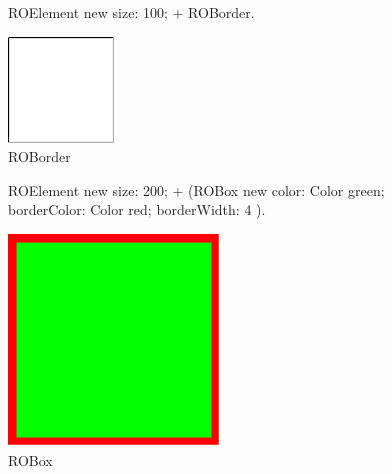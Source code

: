 \documentclass[a4paper,10pt,twoside]{book}
\begin{document}
\begin{figure}[H]
      \begin{minipage}[t]{0.5\textwidth}
      \vspace{0pt}
     \begin{code}
     
	ROElement new 
		size: 100; 
		+ ROBorder.	\end{code}
   \end{minipage}
   \hfill
   \begin{minipage}[t]{0.4\textwidth}
      \vspace{0pt} \raggedright
       \centering
		\includegraphics[width=0.25\textwidth]{border}
   \end{minipage}
\caption{ROBorder}
\label{fig:border}
\end{figure}  

\begin{figure}[H]
      \begin{minipage}[t]{0.5\textwidth}
      \vspace{0pt}
     \begin{code}
     
ROElement new 
	size: 200; 
	+ (ROBox new 
				color: Color green; 
				borderColor: Color red; 
				borderWidth: 4 ).	\end{code}
   \end{minipage}
   \hfill
   \begin{minipage}[t]{0.4\textwidth}
      \vspace{0pt} \raggedright
       \centering
		\includegraphics[width=0.5\textwidth]{box}
   \end{minipage}
\caption{ROBox}
\label{fig:box}
\end{figure} 
\end{document}
